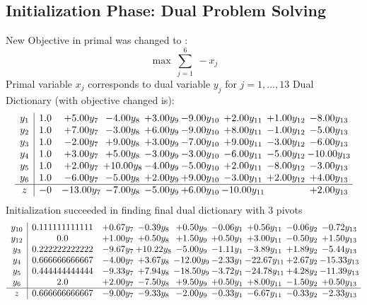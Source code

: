 \documentclass[8pt]{article}
\begin{document}
\subsection{Initialization Phase: Dual Problem Solving}
New Objective in primal was changed to : \[ \max\ \sum_{j=1}^{6}\ - x_j \] 
Primal variable $x_j$ corresponds to dual variable $y_j$ for $j = 1,\ldots,13$
Dual Dictionary (with objective changed is): 
\[\begin{array}{c| c c@{\hskip 2pt} c@{\hskip 2pt} c@{\hskip 2pt} c@{\hskip 2pt} c@{\hskip 2pt} c@{\hskip 2pt} c@{\hskip 2pt} }
 y_{1}   &  1.0 & +  5.00 y_{7} & -4.00 y_{8} & +  3.00 y_{9} & -9.00 y_{10} & +  2.00 y_{11} & +  1.00 y_{12} & -8.00 y_{13}\\
 y_{2}   &  1.0 & +  7.00 y_{7} & -3.00 y_{8} & +  6.00 y_{9} & -9.00 y_{10} & +  8.00 y_{11} & -1.00 y_{12} & -5.00 y_{13}\\
 y_{3}   &  1.0 & -2.00 y_{7} & +  9.00 y_{8} & +  3.00 y_{9} & -7.00 y_{10} & +  9.00 y_{11} & -3.00 y_{12} & -6.00 y_{13}\\
 y_{4}   &  1.0 & +  3.00 y_{7} & +  5.00 y_{8} & -3.00 y_{9} & -3.00 y_{10} & -6.00 y_{11} & -5.00 y_{12} & -10.00 y_{13}\\
 y_{5}   &  1.0 & +  2.00 y_{7} & + 10.00 y_{8} & -4.00 y_{9} & -5.00 y_{10} & +  2.00 y_{11} & -8.00 y_{12} & -3.00 y_{13}\\
 y_{6}   &  1.0 & -6.00 y_{7} & -5.00 y_{8} & +  2.00 y_{9} & +  9.00 y_{10} & -3.00 y_{11} & +  2.00 y_{12} & +  4.00 y_{13}\\
\hline
z    &  -0 & -13.00 y_{7} & -7.00 y_{8} & -5.00 y_{9} & +  6.00 y_{10} & -10.00 y_{11} &   & +  2.00 y_{13}\\
\end{array}\]
Initialization succeeded in finding final dual dictionary with 3 pivots
\[\begin{array}{c| c c@{\hskip 2pt} c@{\hskip 2pt} c@{\hskip 2pt} c@{\hskip 2pt} c@{\hskip 2pt} c@{\hskip 2pt} c@{\hskip 2pt} }
 y_{10}   &  0.111111111111 & +  0.67 y_{7} & -0.39 y_{8} & +  0.50 y_{9} & -0.06 y_{1} & +  0.56 y_{11} & -0.06 y_{2} & -0.72 y_{13}\\
 y_{12}   &  0.0 & +  1.00 y_{7} & +  0.50 y_{8} & +  1.50 y_{9} & +  0.50 y_{1} & +  3.00 y_{11} & -0.50 y_{2} & +  1.50 y_{13}\\
 y_{3}   &  0.222222222222 & -9.67 y_{7} & + 10.22 y_{8} & -5.00 y_{9} & -1.11 y_{1} & -3.89 y_{11} & +  1.89 y_{2} & -5.44 y_{13}\\
 y_{4}   &  0.666666666667 & -4.00 y_{7} & +  3.67 y_{8} & -12.00 y_{9} & -2.33 y_{1} & -22.67 y_{11} & +  2.67 y_{2} & -15.33 y_{13}\\
 y_{5}   &  0.444444444444 & -9.33 y_{7} & +  7.94 y_{8} & -18.50 y_{9} & -3.72 y_{1} & -24.78 y_{11} & +  4.28 y_{2} & -11.39 y_{13}\\
 y_{6}   &  2.0 & +  2.00 y_{7} & -7.50 y_{8} & +  9.50 y_{9} & +  0.50 y_{1} & +  8.00 y_{11} & -1.50 y_{2} & +  0.50 y_{13}\\
\hline
z    &  0.666666666667 & -9.00 y_{7} & -9.33 y_{8} & -2.00 y_{9} & -0.33 y_{1} & -6.67 y_{11} & -0.33 y_{2} & -2.33 y_{13}\\
\end{array}\]
\end{document}
